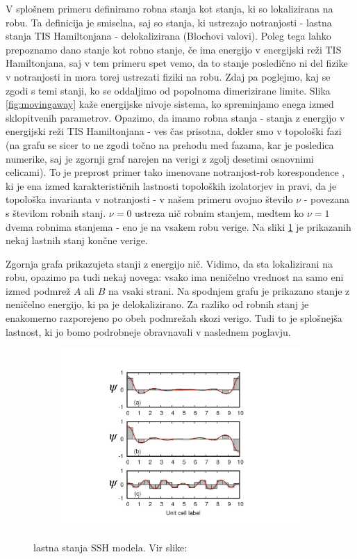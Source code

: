 V splošnem primeru definiramo robna stanja kot stanja, ki so lokalizirana na robu. Ta definicija je smiselna, saj so stanja, ki ustrezajo notranjosti - lastna stanja TIS Hamiltonjana - delokalizirana (Blochovi valovi). Poleg tega lahko prepoznamo dano stanje kot robno stanje, če ima energijo v energijski reži TIS Hamiltonjana, saj v tem primeru spet vemo, da to stanje posledično ni del fizike v notranjosti in mora torej ustrezati fiziki na robu.
Zdaj pa poglejmo, kaj se zgodi s temi stanji, ko se oddaljimo od popolnoma dimerizirane limite. Slika \ref{fig:movingaway} kaže energijske nivoje sistema, ko spreminjamo enega izmed sklopitvenih parametrov. Opazimo, da imamo robna stanja - stanja z energijo v energijski reži TIS Hamiltonjana - ves čas prisotna, dokler smo v topološki fazi (na grafu se sicer to ne zgodi točno na prehodu med fazama, kar je posledica numerike, saj je zgornji graf narejen na verigi z zgolj desetimi osnovnimi celicami). To je preprost primer tako imenovane notranjost-rob korespondence \cite{proof}, ki je ena izmed karakterističnih lastnosti topoloških izolatorjev in pravi, da je topološka invarianta v notranjosti - v našem primeru ovojno število $\nu$ - povezana s številom robnih stanj. $\nu = 0$ ustreza nič robnim stanjem, medtem ko $\nu = 1$ dvema robnima stanjema - eno je na vsakem robu verige.
Na sliki \ref{fig:plots} je prikazanih nekaj lastnih stanj končne verige. 
\begin{multicols}{2}
Zgornja grafa prikazujeta stanji z energijo nič. Vidimo, da sta lokalizirani na robu, opazimo pa tudi nekaj novega: vsako ima neničelno vrednost na samo eni izmed podmrež $A$ ali $B$ na vsaki strani. Na spodnjem grafu je prikazano stanje z neničelno energijo, ki pa je delokalizirano. Za razliko od robnih stanj je enakomerno razporejeno po obeh podmrežah skozi verigo. Tudi to je splošnejša lastnost, ki jo bomo podrobneje obravnavali v naslednem poglavju.
\columnbreak
\begin{figure}[H]
\centering
\begin{subfigure}{.48\textwidth}
\includegraphics[width=\linewidth]{Figures/wave.pdf}
\end{subfigure}
\caption{lastna stanja SSH modela. Vir slike: \cite{arxiv}}
\label{fig:plots}
\end{figure}
\end{multicols}
